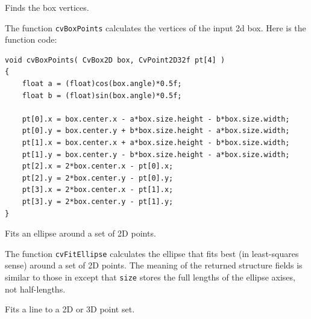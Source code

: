 \label{BoxPoints}

Finds the box vertices.


\begin{description}
\end{description}

The function \texttt{cvBoxPoints} calculates the vertices of the input 2d box. Here is the function code:

\begin{lstlisting}
void cvBoxPoints( CvBox2D box, CvPoint2D32f pt[4] )
{
    float a = (float)cos(box.angle)*0.5f;
    float b = (float)sin(box.angle)*0.5f;

    pt[0].x = box.center.x - a*box.size.height - b*box.size.width;
    pt[0].y = box.center.y + b*box.size.height - a*box.size.width;
    pt[1].x = box.center.x + a*box.size.height - b*box.size.width;
    pt[1].y = box.center.y - b*box.size.height - a*box.size.width;
    pt[2].x = 2*box.center.x - pt[0].x;
    pt[2].y = 2*box.center.y - pt[0].y;
    pt[3].x = 2*box.center.x - pt[1].x;
    pt[3].y = 2*box.center.y - pt[1].y;
}
\end{lstlisting}

\label{FitEllipse}

Fits an ellipse around a set of 2D points.


\begin{description}
\end{description}

The function \texttt{cvFitEllipse} calculates the ellipse that fits best
(in least-squares sense) around a set of 2D points. The meaning of the
returned structure fields is similar to those in  except
that \texttt{size} stores the full lengths of the ellipse axises,
not half-lengths.

\label{FitLine}

Fits a line to a 2D or 3D point set.



